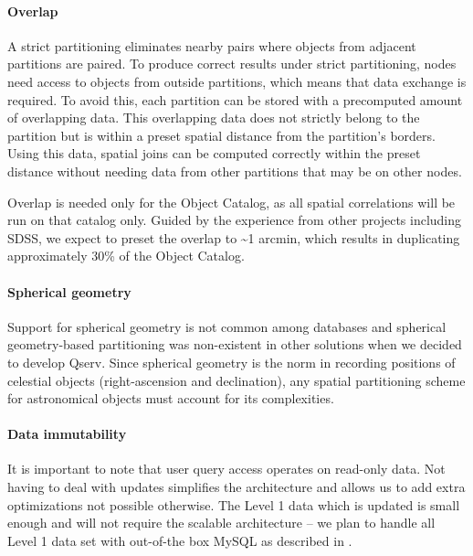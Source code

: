 \documentclass[DM,toc]{lsstdoc}
\begin{document}
\paragraph{Overlap}\label{overlap}

A strict partitioning eliminates nearby pairs where objects from
adjacent partitions are paired. To produce correct results under strict
partitioning, nodes need access to objects from outside partitions,
which means that data exchange is required. To avoid this, each
partition can be stored with a precomputed amount of overlapping data.
This overlapping data does not strictly belong to the partition but is
within a preset spatial distance from the partition's borders. Using
this data, spatial joins can be computed correctly within the preset
distance without needing data from other partitions that may be on other
nodes.

Overlap is needed only for the Object Catalog, as all spatial
correlations will be run on that catalog only. Guided by the experience
from other projects including SDSS, we expect to preset the overlap to
\textasciitilde{}1 arcmin, which results in duplicating approximately
30\% of the Object Catalog.

\paragraph{Spherical geometry}\label{spherical-geometry}

Support for spherical geometry is not common among databases and
spherical geometry-based partitioning was non-existent in other
solutions when we decided to develop Qserv. Since spherical geometry is
the norm in recording positions of celestial objects (right-ascension
and declination), any spatial partitioning scheme for astronomical
objects must account for its complexities.

\paragraph{Data immutability}\label{data-immutability}

It is important to note that user query access operates on read-only
data. Not having to deal with updates simplifies the architecture and
allows us to add extra optimizations not possible otherwise. The Level 1
data which is updated is small enough and will not require the scalable
architecture -- we plan to handle all Level 1 data set with out-of-the
box MySQL as described in .
\end{document}
